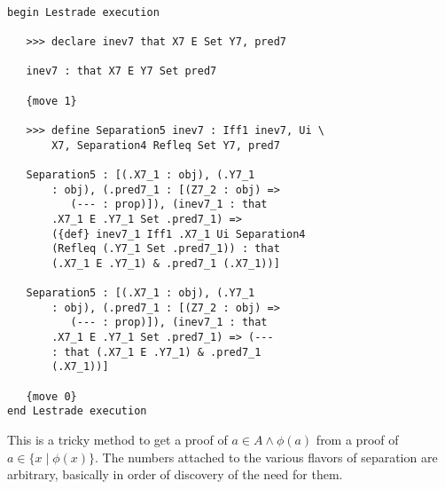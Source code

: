 \documentclass[12pt]{article}
\begin{document}
\begin{verbatim}

begin Lestrade execution

   >>> declare inev7 that X7 E Set Y7, pred7

   inev7 : that X7 E Y7 Set pred7

   {move 1}

   >>> define Separation5 inev7 : Iff1 inev7, Ui \
       X7, Separation4 Refleq Set Y7, pred7

   Separation5 : [(.X7_1 : obj), (.Y7_1 
       : obj), (.pred7_1 : [(Z7_2 : obj) => 
          (--- : prop)]), (inev7_1 : that 
       .X7_1 E .Y7_1 Set .pred7_1) => 
       ({def} inev7_1 Iff1 .X7_1 Ui Separation4 
       (Refleq (.Y7_1 Set .pred7_1)) : that 
       (.X7_1 E .Y7_1) & .pred7_1 (.X7_1))]

   Separation5 : [(.X7_1 : obj), (.Y7_1 
       : obj), (.pred7_1 : [(Z7_2 : obj) => 
          (--- : prop)]), (inev7_1 : that 
       .X7_1 E .Y7_1 Set .pred7_1) => (--- 
       : that (.X7_1 E .Y7_1) & .pred7_1 
       (.X7_1))]

   {move 0}
end Lestrade execution
\end{verbatim}

This is a tricky method to get a proof of $a \in A \wedge \phi(a)$ from a proof of $a \in \{x \mid \phi(x)\}$.  The numbers attached to the various flavors of separation are arbitrary, basically in order of discovery of the need for them.
\end{document}
